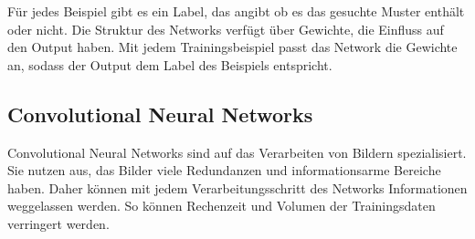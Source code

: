 \documentclass[german,a4paper, 12pt]{llncs}
\begin{document}
Für jedes Beispiel gibt es ein Label, das angibt ob es das gesuchte Muster enthält oder nicht. Die Struktur des Networks verfügt über Gewichte, die Einfluss auf den Output haben. Mit jedem Trainingsbeispiel passt das Network die Gewichte an, sodass der Output dem Label des Beispiels entspricht.\cite{introToCNN,surveyOfDeepLearing}


\subsection{Convolutional Neural Networks}
Convolutional Neural Networks sind auf das Verarbeiten von Bildern spezialisiert. Sie nutzen aus, das Bilder viele Redundanzen und informationsarme Bereiche haben. Daher können mit jedem Verarbeitungsschritt des Networks Informationen weggelassen werden. So können Rechenzeit und Volumen der Trainingsdaten verringert werden.\cite{introToCNN,surveyOfDeepLearing,cNNforClass}


\end{document}
